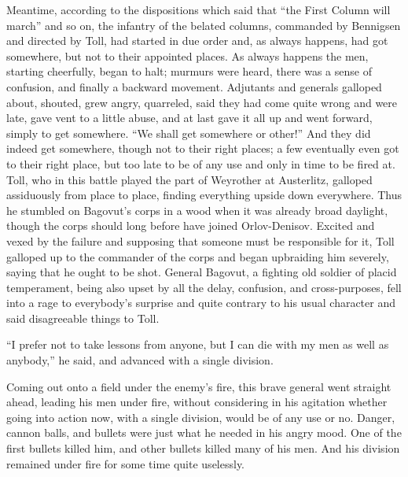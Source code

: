 Meantime, according to the dispositions which said that ``the
First Column will march'' and so on, the infantry of the belated
columns, commanded by Bennigsen and directed by Toll, had started
in due order and, as always happens, had got somewhere, but not
to their appointed places. As always happens the men, starting
cheerfully, began to halt; murmurs were heard, there was a sense
of confusion, and finally a backward movement. Adjutants and
generals galloped about, shouted, grew angry, quarreled, said
they had come quite wrong and were late, gave vent to a little
abuse, and at last gave it all up and went forward, simply to get
somewhere. ``We shall get somewhere or other!'' And they did
indeed get somewhere, though not to their right places; a few
eventually even got to their right place, but too late to be of
any use and only in time to be fired at. Toll, who in this battle
played the part of Weyrother at Austerlitz, galloped assiduously
from place to place, finding everything upside down
everywhere. Thus he stumbled on Bagovut's corps in a wood when it
was already broad daylight, though the corps should long before
have joined Orlov-Denisov. Excited and vexed by the failure and
supposing that someone must be responsible for it, Toll galloped
up to the commander of the corps and began upbraiding him
severely, saying that he ought to be shot. General Bagovut, a
fighting old soldier of placid temperament, being also upset by
all the delay, confusion, and cross-purposes, fell into a rage to
everybody's surprise and quite contrary to his usual character
and said disagreeable things to Toll.

``I prefer not to take lessons from anyone, but I can die with my
men as well as anybody,'' he said, and advanced with a single
division.

Coming out onto a field under the enemy's fire, this brave
general went straight ahead, leading his men under fire, without
considering in his agitation whether going into action now, with
a single division, would be of any use or no. Danger, cannon
balls, and bullets were just what he needed in his angry
mood. One of the first bullets killed him, and other bullets
killed many of his men. And his division remained under fire for
some time quite uselessly.


